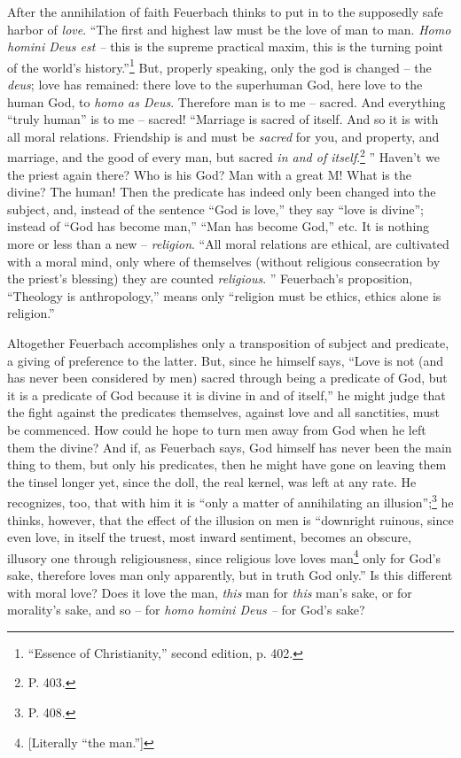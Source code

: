 \documentclass[12pt,a4paper]{book}
\begin{document}
After the annihilation of faith Feuerbach thinks to put in to the supposedly 
safe harbor of \textit{love}. ``The first and highest law must be the love of 
man to man. \textit{Homo homini Deus est --} this is the supreme practical 
maxim, this is the turning point of the world's 
history.''\footnote{``Essence of Christianity,'' second edition, p. 402.} 
But, properly speaking, only the god is changed -- the \textit{deus}; love has 
remained: there love to the superhuman God, here love to the human God, to 
\textit{homo as Deus}. Therefore man is to me -- sacred. And everything 
``truly human'' is to me -- sacred! ``Marriage is sacred of itself. And so 
it is with all moral relations. Friendship is and must be \textit{sacred} for 
you, and property, and marriage, and the good of every man, but sacred 
\textit{in and of itself}.\footnote{P. 403.} '' Haven't we the priest again 
there? Who is his God? Man with a great M! What is the divine? The human! Then 
the predicate has indeed only been changed into the subject, and, instead of 
the sentence ``God is love,'' they say ``love is divine''; instead of 
``God has become man,'' ``Man has become God,'' etc. It is nothing more or 
less than a new -- \textit{religion}. ``All moral relations are ethical, are 
cultivated with a moral mind, only where of themselves (without religious 
consecration by the priest's blessing) they are counted \textit{religious}. 
'' Feuerbach's proposition, ``Theology is anthropology,'' means only 
``religion must be ethics, ethics alone is religion.''

Altogether Feuerbach accomplishes only a transposition of subject and 
predicate, a giving of preference to the latter. But, since he himself says, 
``Love is not (and has never been considered by men) sacred through being a 
predicate of God, but it is a predicate of God because it is divine in and of 
itself,'' he might judge that the fight against the predicates themselves, 
against love and all sanctities, must be commenced. How could he hope to turn 
men away from God when he left them the divine? And if, as Feuerbach says, God 
himself has never been the main thing to them, but only his predicates, then 
he might have gone on leaving them the tinsel longer yet, since the doll, the 
real kernel, was left at any rate. He recognizes, too, that with him it is 
``only a matter of annihilating an illusion'';\footnote{P. 408.} he thinks, 
however, that the effect of the illusion on men is ``downright ruinous, since 
even love, in itself the truest, most inward sentiment, becomes an obscure, 
illusory one through religiousness, since religious love loves 
man\footnote{[Literally ``the man.'']} only for God's sake, therefore loves 
man only apparently, but in truth God only.'' Is this different with moral 
love? Does it love the man, \textit{this} man for \textit{this} man's sake, or 
for morality's sake, and so -- for \textit{homo homini Deus --} for God's 
sake?
\end{document}
